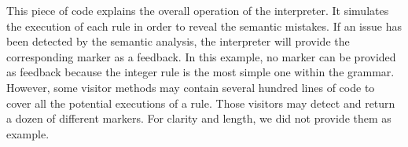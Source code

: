 \documentclass[11pt,a4paper,twoside,openright]{report}
\begin{document}
This piece of code explains the overall operation of the interpreter. It 
simulates the execution of each rule in order to reveal the semantic mistakes. 
If an issue has been detected by the semantic analysis, the interpreter will 
provide the corresponding marker as a feedback. In this example, no marker can 
be provided as feedback because the integer rule is the most simple one within 
the grammar. However, some visitor methods may contain several hundred lines of 
code to cover all the potential executions of a rule. Those visitors may 
detect and return a dozen of different markers. For clarity and length, we did 
not provide them as example.


% 
% 
% 
% 
% 
\end{document}
